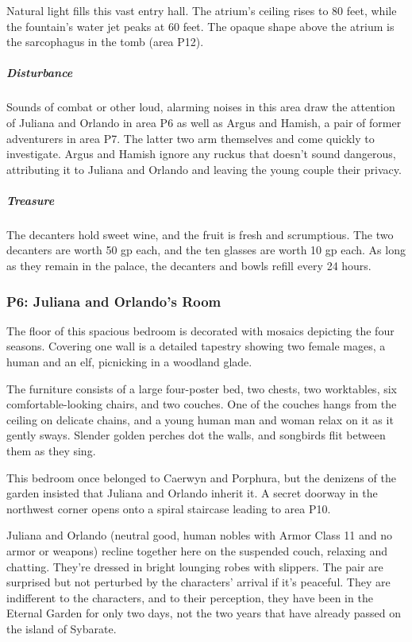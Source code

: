 \documentclass[10pt,a4paper,twoside,bg=print,twocolumn,openany,nodeprecatedcode]{dndbook}
\begin{document}
Natural light fills this vast entry hall. The atrium's ceiling rises to 80 feet, while the fountain's water jet peaks at 60 feet. The opaque shape above the atrium is the sarcophagus in the tomb (area P12).

\subparagraph{Disturbance}
Sounds of combat or other loud, alarming noises in this area draw the attention of Juliana and Orlando in area P6 as well as Argus and Hamish, a pair of former adventurers in area P7. The latter two arm themselves and come quickly to investigate. Argus and Hamish ignore any ruckus that doesn't sound dangerous, attributing it to Juliana and Orlando and leaving the young couple their privacy.

\subparagraph{Treasure}
The decanters hold sweet wine, and the fruit is fresh and scrumptious. The two decanters are worth 50 gp each, and the ten glasses are worth 10 gp each. As long as they remain in the palace, the decanters and bowls refill every 24 hours.

\subsubsection{P6: Juliana and Orlando's Room}
\begin{DndReadAloud}{}
The floor of this spacious bedroom is decorated with mosaics depicting the four seasons. Covering one wall is a detailed tapestry showing two female mages, a human and an elf, picnicking in a woodland glade.

The furniture consists of a large four-poster bed, two chests, two worktables, six comfortable-looking chairs, and two couches. One of the couches hangs from the ceiling on delicate chains, and a young human man and woman relax on it as it gently sways. Slender golden perches dot the walls, and songbirds flit between them as they sing.

\end{DndReadAloud}

This bedroom once belonged to Caerwyn and Porphura, but the denizens of the garden insisted that Juliana and Orlando inherit it. A secret doorway in the northwest corner opens onto a spiral staircase leading to area P10.

Juliana and Orlando (neutral good, human nobles with Armor Class 11 and no armor or weapons) recline together here on the suspended couch, relaxing and chatting. They're dressed in bright lounging robes with slippers. The pair are surprised but not perturbed by the characters' arrival if it's peaceful. They are indifferent to the characters, and to their perception, they have been in the Eternal Garden for only two days, not the two years that have already passed on the island of Sybarate.
\end{document}
